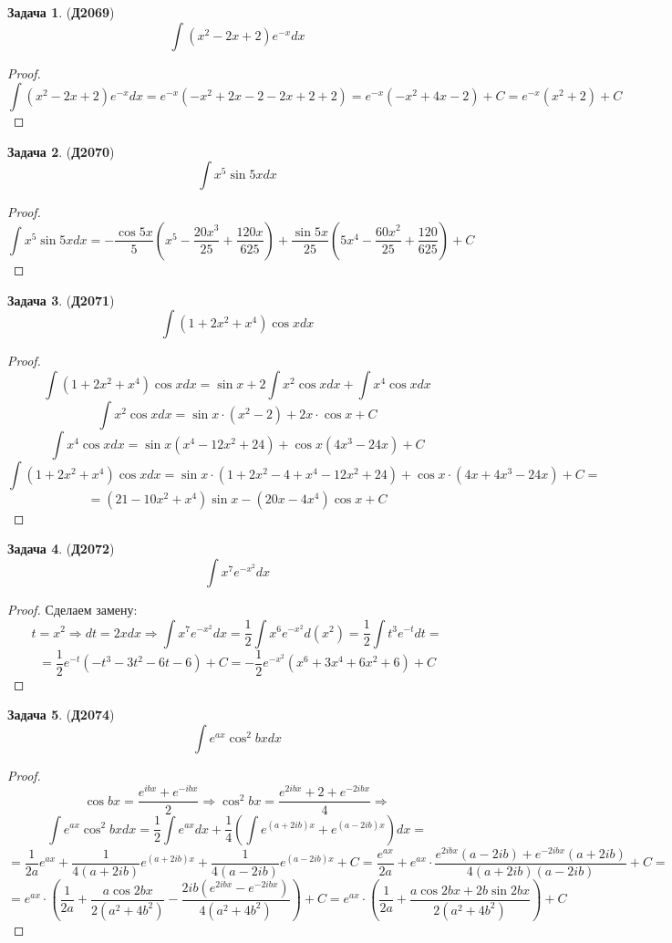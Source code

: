 \documentclass[12pt]{article}
\theoremstyle{definition}
\newtheorem{problem}{Задача}
\DeclareMathOperator{\dint}{\displaystyle\int}
\begin{document}
\begin{problem}(\textbf{Д2069})
	$$
		\dint (x^2 - 2x + 2)e^{-x}dx
	$$
\end{problem}
\begin{proof}
	$$
		\dint (x^2 - 2x + 2)e^{-x}dx = e^{-x}\left(-x^2 + 2x -2 - 2x + 2 +2\right) = e^{-x}(-x^2 + 4x - 2) + C = e^{-x}(x^2 + 2) + C
	$$
\end{proof}
\begin{problem}(\textbf{Д2070})
	$$
		\dint x^5\sin{5x}dx
	$$
\end{problem}
\begin{proof}
	$$
		\dint x^5\sin{5x}dx = -\dfrac{\cos{5x}}{5}\left(x^5 -\dfrac{20x^3}{25} + \dfrac{120x}{625}\right) + \dfrac{\sin{5x}}{25}\left(5x^4 - \dfrac{60x^2}{25} + \dfrac{120}{625}\right) + C
	$$
\end{proof}

\begin{problem}(\textbf{Д2071})
	$$
		\dint (1 + 2x^2 + x^4)\cos{x}dx
	$$
\end{problem}
\begin{proof}
	$$
		\dint (1 + 2x^2 + x^4)\cos{x}dx = \sin{x} + 2\dint x^2 \cos{x} dx + \dint x^4 \cos{x} dx
	$$
	$$
		\dint x^2 \cos{x} dx = \sin{x}{\cdot}(x^2 - 2) + 2x{\cdot}\cos{x} + C
	$$
	$$
		\dint x^4 \cos{x} dx = \sin{x}(x^4 - 12x^2 + 24) + \cos{x}(4x^3 - 24x) + C
	$$
	$$
		\dint (1 + 2x^2 + x^4)\cos{x}dx = \sin{x}{\cdot}(1 +2x^2 - 4 + x^4 -12x^2 + 24) + \cos{x}{\cdot}(4x + 4x^3 - 24x) + C = 
	$$
	$$
		=	(21 -10x^2 + x^4)\sin{x} - (20x -4x^4)\cos{x} + C
	$$
\end{proof}
\begin{problem}(\textbf{Д2072})
	$$
		\dint x^7e^{-x^2}dx
	$$
\end{problem}
\begin{proof}
	Сделаем замену:
	$$
		t = x^2 \Rightarrow dt = 2xdx \Rightarrow \dint x^7e^{-x^2}dx = \dfrac{1}{2}\dint x^6e^{-x^2}d(x^2) = \dfrac{1}{2}\dint t^3 e^{-t}dt =
	$$
	$$	
		= \dfrac{1}{2}e^{-t}(-t^3 - 3t^2 - 6t - 6) + C = -\dfrac{1}{2}e^{-x^2}(x^6 + 3x^4 + 6x^2 + 6) +C
	$$
\end{proof}

\begin{problem}(\textbf{Д2074})
	$$
		\dint e^{ax}\cos^2{bx}dx
	$$
\end{problem}
\begin{proof}
	$$
		\cos{bx} = \dfrac{e^{ibx} + e^{-ibx}}{2} \Rightarrow \cos^2{bx} = \dfrac{e^{2ibx} + 2 + e^{-2ibx}}{4} \Rightarrow 
	$$
	$$
		\dint e^{ax}\cos^2{bx}dx = \dfrac{1}{2}\dint e^{ax}dx + \dfrac{1}{4}\left(\dint e^{(a + 2ib)x} + e^{(a - 2ib)x}\right)dx =
	$$
	$$	
		= \dfrac{1}{2a}e^{ax} + \dfrac{1}{4(a + 2ib)}e^{(a + 2ib)x} + \dfrac{1}{4(a - 2ib)}e^{(a -2ib)x} + C= \dfrac{e^{ax}}{2a} + e^{ax}{\cdot}\dfrac{e^{2ibx}(a-2ib) + e^{-2ibx}(a + 2ib)}{4(a + 2ib)(a-2ib)} + C= 
	$$
	$$
		= e^{ax}{\cdot}\left(\dfrac{1}{2a} + \dfrac{a\cos{2bx}}{2(a^2 +4b^2)} - \dfrac{2ib(e^{2ibx} - e^{-2ibx})}{4(a^2 + 4b^2)}\right) + C = e^{ax}{\cdot}\left(\dfrac{1}{2a} + \dfrac{a\cos{2bx} + 2b\sin{2bx}}{2(a^2 + 4b^2)}\right) + C
	$$
	
\end{proof}
\end{document}
